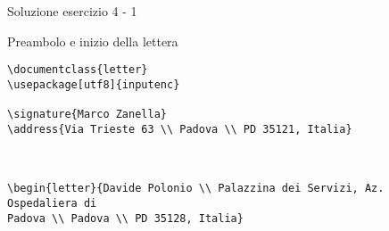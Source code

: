 \begin{frame}[fragile]{Soluzione esercizio 4 - 1}

Preambolo e inizio della lettera
\begin{lstlisting}
\documentclass{letter}
\usepackage[utf8]{inputenc}

\signature{Marco Zanella}
\address{Via Trieste 63 \\ Padova \\ PD 35121, Italia}



\begin{letter}{Davide Polonio \\ Palazzina dei Servizi, Az. Ospedaliera di 
Padova \\ Padova \\ PD 35128, Italia}
\end{lstlisting}

\end{frame}